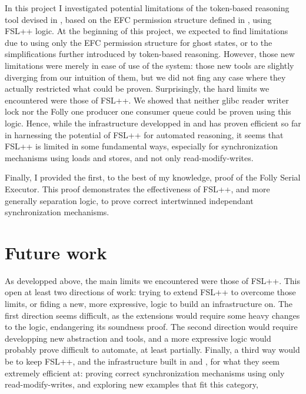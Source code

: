 In this project I investigated potential limitations of the token-based reasoning tool devised in \cite{pascal}, based on the EFC permission structure defined in \cite{gaurav}, using FSL++ logic. At the beginning of this project, we expected to find limitations due to using only the EFC permission structure for ghost states, or to the simplifications further introduced by token-based reasoning. However, those new limitations were merely in ease of use of the system: those new tools are slightly diverging from our intuition of them, but we did not fing any case where they actually restricted what could be proven. Surprisingly, the hard limits we encountered were those of FSL++. We showed that neither glibc reader writer lock \cite{glibcRW} nor the Folly one producer one consumer queue \cite{queue} could be proven using this logic. Hence, while the infrastructure developped in \cite{gaurav} and \cite{pascal} has proven efficient so far in harnessing the potential of FSL++ for automated reasoning, it seems that FSL++ is limited in some fundamental ways, especially for synchronization mechanisms using loads and stores, and not only read-modify-writes.

Finally, I provided the first, to the best of my knowledge, proof of the Folly Serial Executor. This proof demonstrates the effectiveness of FSL++, and more generally separation logic, to prove correct intertwinned independant synchronization mechanisms.

\section{Future work}

As developped above, the main limits we encountered were those of FSL++. This open at least two directions of work: trying to extend FSL++ to overcome those limits, or fiding a new, more expressive, logic to build an infrastructure on. The first direction seems difficult, as the extensions would require some heavy changes to the logic, endangering its soundness proof. The second direction would require developping new abstraction and tools, and a more expressive logic would probably prove difficult to automate, at least partially. Finally, a third way would be to keep FSL++, and the infrastructure built in \cite{gaurav} and \cite{pascal}, for what they seem extremely efficient at: proving correct synchronization mechanisms using only read-modify-writes, and exploring new examples that fit this category,
